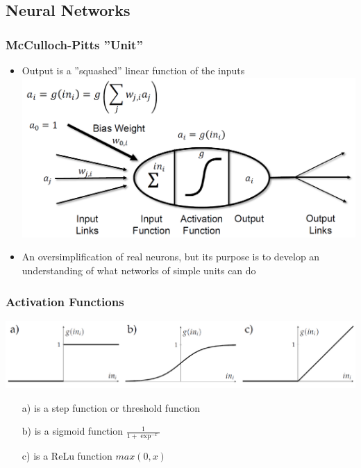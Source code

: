 \documentclass[conference, a4paper]{styles/acmsiggraph}
\begin{document}
    \subsection{Neural Networks}
        \subsubsection{McCulloch-Pitts ''Unit''}
            \begin{itemize}
                \item Output is a ''squashed'' linear function of the inputs\newline
                \includegraphics[width=1\textwidth]{imgs/McCulloch.png}
                \item An oversimplification of real neurons, but its purpose is to develop an understanding of what networks of simple units can do
            \end{itemize}
        
        \subsubsection{Activation Functions}
            \includegraphics[width=1\textwidth]{imgs/ActivationFunctions.png}
            \begin{itemize}
                \item[a)] is a step function or threshold function
                \item[b)] is a sigmoid function $\frac{1}{1 + \exp^{-x}}$
                \item[c)] is a ReLu function $max(0,x)$
            \end{itemize}
        
\end{document}
